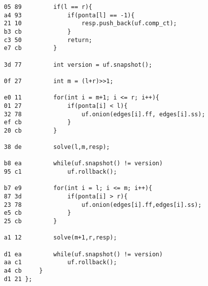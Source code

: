 \documentclass[11pt, a4paper, twoside]{article}
\begin{document}
\begin{lstlisting}
05 89         if(l == r){
a4 93             if(ponta[l] == -1){
21 10                 resp.push_back(uf.comp_ct);
b3 cb             }
c3 50             return;
e7 cb         }
      
3d 77         int version = uf.snapshot();
      
0f 27         int m = (l+r)>>1;
      
e0 11         for(int i = m+1; i <= r; i++){
01 27             if(ponta[i] < l){
32 78                 uf.onion(edges[i].ff, edges[i].ss);
ef cb             }
20 cb         }
      
38 de         solve(l,m,resp);
      
b8 ea         while(uf.snapshot() != version)
95 c1             uf.rollback();
      
b7 e9         for(int i = l; i <= m; i++){
87 3d             if(ponta[i] > r){
23 78                 uf.onion(edges[i].ff,edges[i].ss);
e5 cb             }
25 cb         }
      
a1 12         solve(m+1,r,resp);
      
d1 ea         while(uf.snapshot() != version)
aa c1             uf.rollback();
a4 cb     }
d1 21 };
\end{lstlisting}
\end{document}
